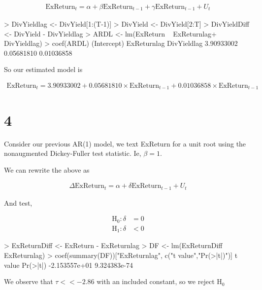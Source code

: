 \documentclass{article}
\begin{document}
\begin{singlespace}
\begin{align*}
\text{ExReturn}_{t} = \alpha + \beta \text{ExReturn}_{t-1} + \gamma \text{ExReturn}_{t-1} + U_{t}
\end{align*}

	\begin{spverbatim}
		> DivYieldlag <- DivYield[1:(T-1)]
		> DivYield <- DivYield[2:T]
		> DivYieldDiff <- DivYield - DivYieldlag
		> ARDL <- lm(ExReturn ~ ExReturnlag+ DivYieldlag)
		> coef(ARDL)
		(Intercept) ExReturnlag DivYieldlag 
		3.90933002  0.05681810  0.01036858 
	\end{spverbatim}
\end{singlespace}

So our estimated model is
\begin{singlespace}
\begin{align*}
\text{ExReturn}_{t} = 3.90933002 + 0.05681810\times \text{ExReturn}_{t-1} +  0.01036858\times \text{ExReturn}_{t-1}
\end{align*}
\end{singlespace}

\section*{4}

Consider our previous AR(1) model, we text ExReturn for a unit root using the nonaugmented Dickey-Fuller test statistic. Ie, $\beta = 1$.

We can rewrite the above as 

\begin{singlespace}
\begin{align*}
\Delta \text{ExReturn}_{t} =  \alpha + \delta\text{ExReturn}_{t-1} + U_{t}
\end{align*}
\end{singlespace}


And test, 

\begin{singlespace}
\begin{align*}
\text{H}_0:\delta&= 0\\
	\text{H}_1:\delta&< 0
\end{align*}


	\begin{spverbatim}
		> ExReturnDiff <- ExReturn - ExReturnlag
		> DF <- lm(ExReturnDiff ~ ExReturnlag)
		> coef(summary(DF))["ExReturnlag", c("t value","Pr(>|t|)")]
		      t value      Pr(>|t|) 
		-2.153557e+01  9.324383e-74 
	\end{spverbatim}
\end{singlespace}

We observe that $\tau << -2.86 $ with an included constant, so we reject $\text{H}_0$
\end{document}
